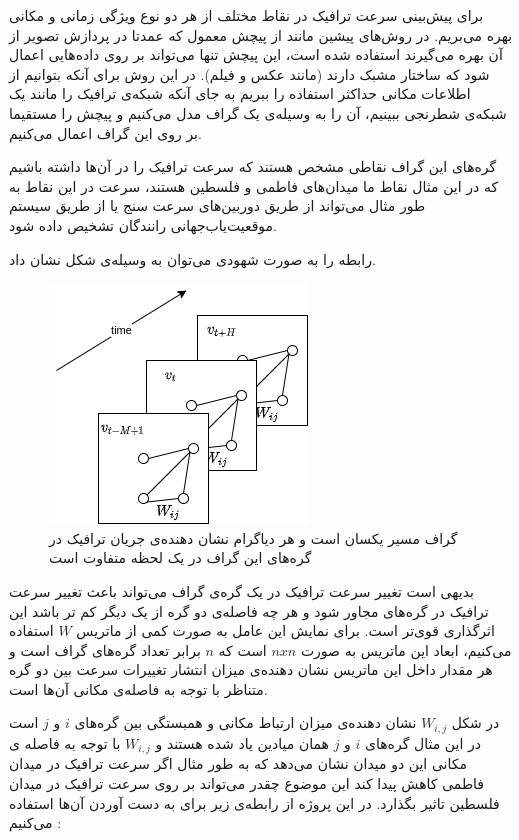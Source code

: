 \documentclass{article}
\begin{document}
برای پیش‌بینی سرعت ترافیک در نقاط مختلف از هر دو نوع ویژگی زمانی و مکانی بهره می‌بریم.
در روش‌های پیشین مانند  از پیچش معمول که عمدتا در پردازش تصویر از آن بهره می‌گیرند استفاده شده است، این پیچش تنها می‌تواند بر روی داده‌هایی اعمال شود که ساختار مشبک دارند (مانند عکس و فیلم).
در این روش برای آنکه بتوانیم از اطلاعات مکانی حداکثر استفاده را ببریم به جای آنکه شبکه‌ی ترافیک را مانند یک شبکه‌‌ی شطرنجی ببینیم،
آن را به وسیله‌ی یک گراف مدل می‌کنیم و پیچش را مستقیما بر روی این گراف اعمال می‌کنیم.

گره‌های این گراف نقاطی مشخص هستند که سرعت ترافیک را در آن‌ها داشته باشیم که در این مثال نقاط ما میدان‌های فاطمی و فلسطین هستند،
سرعت در این نقاط به طور مثال می‌تواند از طریق دوربین‌های سرعت سنج یا از طریق سیستم موقعیت‌‌یاب‌جهانی رانندگان تشخیص داده شود.

رابطه  را به صورت شهودی می‌توان به وسیله‌ی شکل  نشان داد.

\begin{figure}
  \includegraphics{./images/base.png}
  \centering
  \caption{
گراف مسیر یکسان است و هر دیاگرام نشان دهنده‌ی جریان ترافیک در گره‌های این گراف در یک لحظه متفاوت است
  }
  \label{fig:base}
\end{figure}

بدیهی است تغییر سرعت ترافیک در یک گره‌ی گراف می‌تواند باعث تغییر سرعت ترافیک در گره‌های مجاور شود و هر چه فاصله‌ی دو گره از یک دیگر کم تر باشد این اثرگذاری قوی‌تر است.
برای نمایش این عامل به صورت کمی از ماتریس $W$ استفاده می‌کنیم، ابعاد این ماتریس به صورت $n x n$ است که $n$ برابر تعداد گره‌های گراف است و هر مقدار داخل این ماتریس نشان دهنده‌ی میزان انتشار تغییرات سرعت بین دو گره متناظر با توجه به فاصله‌ی مکانی آن‌ها است.

در شکل  $W_{i,j}$ نشان دهنده‌ی میزان ارتباط مکانی و همبستگی بین گره‌های $i$ و $j$ است در این مثال گره‌های $i$ و $j$ همان میادین یاد شده هستند و $W_{i,j}$ با توجه به فاصله ی مکانی این دو میدان نشان می‌دهد که
به طور مثال اگر سرعت ترافیک در میدان فاطمی کاهش پیدا کند این موضوع چقدر می‌تواند بر روی سرعت ترافیک در میدان فلسطین تاثیر بگذارد.
در این پروژه از رابطه‌ی زیر برای به دست آوردن آن‌ها استفاده می‌کنیم :
\end{document}
